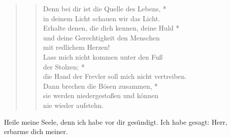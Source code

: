 \begin{quote}
\begin{verse}
Denn bei dir ist die Quelle des Lebens, *\\
in deinem Licht schauen wir das Licht.\\ 
\vin Erhalte denen, die dich kennen, deine Huld *\\ 
\vin und deine Gerechtigkeit den Menschen\\ 
\vin mit redlichem Herzen!\\
Lass mich nicht kommen unter den Fuß\\
der Stolzen; *\\
die Hand der Frevler soll mich nicht vertreiben.\\
\vin Dann brechen die Bösen zusammen, *\\ 
\vin sie werden niedergestoßen und können \\ 
\vin nie wieder aufstehn.\\ 

\end{verse}
\end{quote}

\medskip

\resp


\medskip

\begin{sloppypar}
{\noindent\rm{ Heile meine Seele, denn ich habe vor dir gesündigt. Ich habe gesagt: Herr, erbarme dich meiner.}}
\end{sloppypar}

\medskip
\bigskip


\medskip

\begin{flushleft}


\medskip
{\rm{
}}
\end{flushleft}



\def\greinitialformat#1{{\fontsize{40}{40}\selectfont #1}}
\gresetfirstlineaboveinitial{\footnotesize \textcolor{red}{Bendic}}{}
\setaboveinitialseparation{0.72mm}

